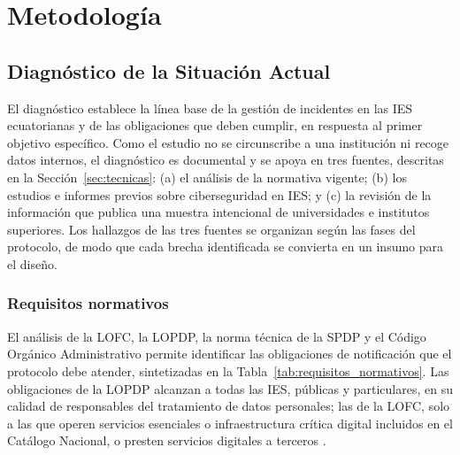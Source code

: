 \chapter{Metodología}
\label{chap:metodologia}

\section{Diagnóstico de la Situación Actual}
\label{sec:diagnostico}
El diagnóstico establece la línea base de la gestión de incidentes en las IES ecuatorianas y de las obligaciones que deben cumplir, en respuesta al primer objetivo específico. Como el estudio no se circunscribe a una institución ni recoge datos internos, el diagnóstico es documental y se apoya en tres fuentes, descritas en la Sección~\ref{sec:tecnicas}: (a) el análisis de la normativa vigente; (b) los estudios e informes previos sobre ciberseguridad en IES; y (c) la revisión de la información que publica una muestra intencional de universidades e institutos superiores. Los hallazgos de las tres fuentes se organizan según las fases del protocolo, de modo que cada brecha identificada se convierta en un insumo para el diseño.

\subsection{Requisitos normativos}
El análisis de la LOFC, la LOPDP, la norma técnica de la SPDP y el Código Orgánico Administrativo permite identificar las obligaciones de notificación que el protocolo debe atender, sintetizadas en la Tabla~\ref{tab:requisitos_normativos}. Las obligaciones de la LOPDP alcanzan a todas las IES, públicas y particulares, en su calidad de responsables del tratamiento de datos personales; las de la LOFC, solo a las que operen servicios esenciales o infraestructura crítica digital incluidos en el Catálogo Nacional, o presten servicios digitales a terceros \cite{lofc2026,lopdp2021}.

